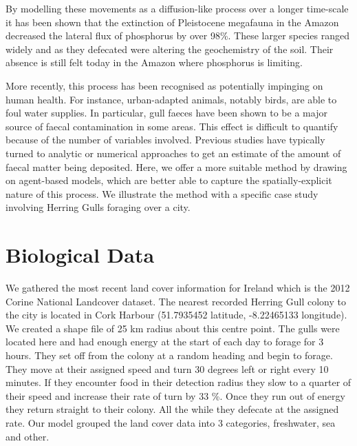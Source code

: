 \documentclass[a4paper,12pt]{article}
\begin{document}
By modelling these movements as a diffusion-like process over a longer time-scale it has been shown that the extinction of Pleistocene megafauna in the Amazon decreased the lateral flux of phosphorus by over 98\%. 
These larger species ranged widely and as they defecated were altering the geochemistry of the soil. 
Their absence is still felt today in the Amazon where phosphorus is limiting. 

More recently, this process has been recognised as potentially impinging on human health. 
For instance, urban-adapted animals, notably birds, are able to foul water supplies. 
In particular, gull faeces have been shown to be a major source of faecal contamination in some areas. 
This effect is difficult to quantify because of the number of variables involved. 
Previous studies have typically turned to analytic or numerical approaches to get an estimate of the amount of faecal matter being deposited.
Here, we offer a more suitable method by drawing on agent-based models, which are better able to capture the spatially-explicit nature of this process. 
We illustrate the method with a specific case study involving Herring Gulls foraging over a city. 


\section*{Biological Data}


We gathered the most recent land cover information for Ireland which is the 2012 Corine National Landcover dataset.  
The nearest recorded Herring Gull colony to the city is located in Cork Harbour (51.7935452 latitude, -8.22465133 longitude). 
We created a shape file of 25 km radius about this centre point. 
The gulls were located here and had enough energy at the start of each day to forage for 3 hours. 
They set off from the colony at a random heading and begin to forage. 
They move at their assigned speed and turn 30 degrees left or right every 10 minutes.
If they encounter food in their detection radius they slow to a quarter of their speed and increase their rate of turn by 33 \%.
Once they run out of energy they return straight to their colony. 
All the while they defecate at the assigned rate. 
Our model grouped the land cover data into 3 categories, freshwater, sea and other. 
\end{document}
